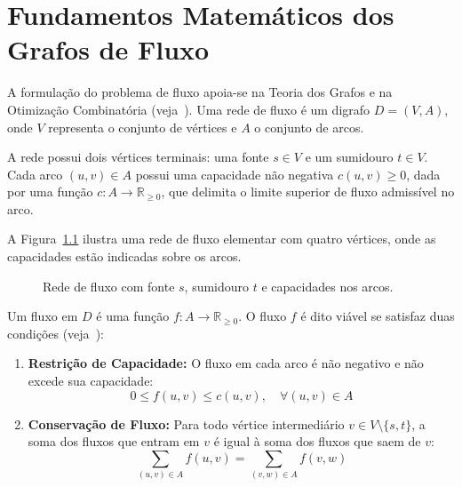 \chapter{Fundamentos Matemáticos dos Grafos de Fluxo}\label{sec:base_matematica}

A formulação do problema de fluxo apoia-se na Teoria dos Grafos e na Otimização Combinatória (veja~\cite{ahuja1993network, bondy2008graph}). Uma rede de fluxo é um digrafo $D = (V, A)$, onde $V$ representa o conjunto de vértices e $A$ o conjunto de arcos.

A rede possui dois vértices terminais: uma fonte $s \in V$ e um sumidouro $t \in V$. Cada arco $(u,v) \in A$ possui uma capacidade não negativa $c(u,v) \ge 0$, dada por uma função $c: A \rightarrow \mathbb{R}_{\ge 0}$, que delimita o limite superior de fluxo admissível no arco.

A Figura~\ref{fig:rede_fluxo} ilustra uma rede de fluxo elementar com quatro vértices, onde as capacidades estão indicadas sobre os arcos.

\begin{figure}[!ht]
\centering
{}
\caption{Rede de fluxo com fonte $s$, sumidouro $t$ e capacidades nos arcos.}
\label{fig:rede_fluxo}
\end{figure}

Um fluxo em $D$ é uma função $f: A \rightarrow \mathbb{R}_{\ge 0}$. O fluxo $f$ é dito viável se satisfaz duas condições (veja~\cite{ford1956maximal, cook1998combinatorial}):

\begin{enumerate}
    \item \textbf{Restrição de Capacidade:} O fluxo em cada arco é não negativo e não excede sua capacidade:
    \begin{equation}
        0 \le f(u,v) \le c(u,v), \quad \forall (u,v) \in A
    \end{equation}

    \item \textbf{Conservação de Fluxo:} Para todo vértice intermediário $v \in V \setminus \{s, t\}$, a soma dos fluxos que entram em $v$ é igual à soma dos fluxos que saem de $v$:
    \begin{equation}
        \sum_{(u,v) \in A} f(u,v) = \sum_{(v,w) \in A} f(v,w)
    \end{equation}
\end{enumerate}

